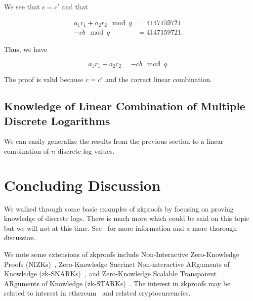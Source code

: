 \begin{example}
\noindent
We see that $c=c'$ and that

\begin{align}
    a_{1}r_{1} + a_{2}r_{2} \mod q &= 4147159721 \nonumber\\
    -cb \mod q &= 4147159721.
\end{align}

\noindent
Thus, we have

\begin{equation}
    a_{1}r_{1} + a_{2}r_{2} = -cb \mod q.
\end{equation}

\noindent
The proof is valid because $c=c'$ and the correct linear combination.


\end{example}

\subsection{Knowledge of Linear Combination of Multiple Discrete Logarithms}

We can easily generalize the results from the previous section
to a linear combination of $n$ \gls{discrete log} values.



\section{Concluding Discussion}

We walked through some basic examples of \glspl{zkproof}
by focusing on proving knowledge of \glspl{discrete log}.
There is much more which could be said on this topic
but we will not at this time.
See~\cite{GeneralDiscreteLogProofs} for more information
and a more thorough discussion.

We note some extensions of \glspl{zkproof} include
Non-Interactive Zero-Knowledge Proofs
(NIZKs)~\cite{rackoff1991nizk,santis1987nizk},
Zero-Knowledge Succinct Non-interactive ARguments of Knowledge
(zk-SNARKs)~\cite{cryptoeprint:2011:443},
and Zero-Knowledge Scalable Transparent ARguments of Knowledge
(zk-STARKs)~\cite{cryptoeprint:2018:046,cryptoeprint:2018:1098}.
The interest in \glspl{zkproof} may be related
to interest in \gls{ethereum}~\cite{EthereumYellowpaper}
and related cryptocurrencies.
